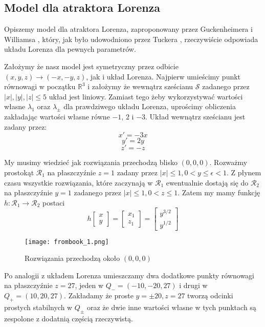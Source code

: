 \documentclass[12pt]{report}
\newcommand{\R}{\mathbb{R}}
\begin{document}
	\subsection{Model dla atraktora Lorenza}
	\par Opiszemy model dla atraktora Lorenza, zaproponowany przez Guckenheimera i Williamsa \cite{GW}, który, jak było udowodniono przez Tuckera \cite{Tucker}, rzeczywiście odpowiada układu Lorenza dla pewnych parametrów.
	
	\par Założymy że nasz model jest symetryczny przez odbicie $(x, y, z) \to (-x, -y, z)$, jak i układ Lorenza. Najpierw umieścimy punkt równowagi w początku $\R^3$ i założymy że wewnątrz sześcianu $\mathcal{S}$ zadanego przez $\lvert x \rvert, \lvert y \rvert, \lvert z \rvert \le 5$ układ jest liniowy. Zamiast tego żeby wykorzystywać wartości własne $\lambda_1$ oraz $\lambda_{\pm}$ dla prawdziwego układu Lorenza, uprościmy obliczenia zakładając wartości własne równe $-1$, $2$ i $-3$. Układ wewnątrz sześcianu jest zadany przez:
		\[ x' = -3x \]
		\[ y' = 2y \]
		\[ z' = -z \]
	\par My musimy wiedzieć jak rozwiązania przechodzą blisko $(0, 0, 0)$. Rozważmy prostokąt $\mathcal{R}_1$ na płaszczyźnie  $z = 1$ zadany przez $\lvert x \rvert \le 1, 0 < y \le \epsilon < 1$. Z płynem czasu wszystkie rozwiązania, które zaczynają w $\mathcal{R}_1$ ewentualnie dostają się do $\mathcal{R}_2$ na płaszczyźnie  $y = 1$ zadanego przez $\lvert x \rvert \le 1, 0 < z \le 1$. Zatem my mamy funkcję $h: \mathcal{R}_1 \to \mathcal{R}_2$ postaci
		\[ h \begin{bmatrix} x \\ y \end{bmatrix} = \begin{bmatrix} x_1 \\ z_1 \end{bmatrix} = \begin{bmatrix} y^{3/2} \\ y^{1/2} \end{bmatrix} \]
	\begin{figure}[H]
		\centering
		\texttt{[image: frombook\_1.png]}
		\caption{Rozwiązania przechodzą około $(0, 0, 0)$}
		\label{fig:frombook_1}
	\end{figure}
	\par Po analogii z układem Lorenza umieszczamy dwa dodatkowe punkty równowagi na płaszczyźnie $z = 27$, jeden w $Q_- = (-10, -20, 27)$ i drugi w $Q_+ = (10, 20, 27)$. Zakładamy że proste $y = \pm 20, z = 27$ tworzą odcinki prostych stabilnych w $Q_{\pm}$ oraz że dwie inne wartości własne w tych punktach są zespolone z dodatnią częścią rzeczywistą.
\end{document}
